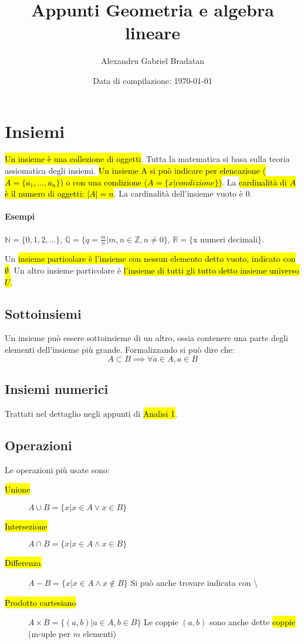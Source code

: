 \documentclass[a4paper,12pt,oneside]{article}
\title{Appunti Geometria e algebra lineare}
\author{Alexandru Gabriel Bradatan}
\date{Data di compilazione: \today}
\begin{document}
\maketitle

\section{Insiemi}
\hl{Un insieme è una collezione di oggetti}. Tutta la matematica si basa
sulla teoria assiomatica degli insiemi. \hl{Un insieme A si può indicare
per elencazione ($A = \{a_1, \dots, a_n\}$) o con una condizione
($A = \{x|\textit{condizione}\}$)}. La \hl{cardinalità di $A$ è il numero di
oggetti: $|A| = n$}. La cardinalità dell'insieme vuoto è 0.

\paragraph{Esempi} $\mathbb{N} = \{0, 1, 2,\dots\}$,
$\mathbb{Q} = \{q = \frac{m}{n} | m,n \in \mathbb{Z}, n \neq 0\}$,
$\mathbb{R} = \{\text{x numeri decimali}\}$.

Un \hl{insieme particolare è l'insieme con nessun elemento detto vuoto, indicato
con $\emptyset$}. Un altro insieme particolare è \hl{l'insieme di tutti gli tutto
detto insieme universo $U$}.

\subsection{Sottoinsiemi}
Un insieme può essere sottoinsieme di un altro, ossia contenere una parte degli
elementi dell'insieme più grande. Formalizzando si può dire che:
\[
    A \subset B \implies \forall a \in A, a \in B
\]

\subsection{Insiemi numerici}
Trattati nel dettaglio negli appunti di \hl{Analisi 1}.

\subsection{Operazioni}
Le operazioni più usate sono:
\begin{description}
    \item[\hl{Unione}] $A \cup B = \{x | x \in A \vee x \in B\}$
    \item[\hl{Intersezione}] $A \cap B = \{x | x \in A \wedge x \in B\}$
    \item[\hl{Differenza}] $A - B = \{x | x \in A \wedge x \notin B\}$
        Si può anche trovare indicata con $ \setminus $
    \item[\hl{Prodotto cartesiano}] $A \times B = \{(a,b) | a \in A, b \in B \}$
        Le coppie $(a,b)$ sono anche dette \hl{coppie} (m-uple per $m$ elementi)
\end{description}
\end{document}
